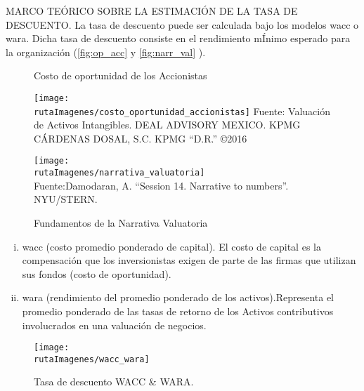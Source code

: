 \textcolor{secundario}{MARCO TE\'ORICO SOBRE LA ESTIMACI\'ON DE LA TASA DE DESCUENTO}. La tasa de descuento puede ser calculada bajo los modelos \gls{wacc} o \gls{wara}. Dicha tasa de descuento consiste en el rendimiento m\'Inimo esperado para la organizaci\'on (\autoref{fig:op_acc} y \autoref{fig:narr_val} ).

\begin{figure}[H]
\begin{minipage}{8cm}
\caption{Costo de oportunidad de los Accionistas\label{fig:op_acc}}
\texttt{[image: \\rutaImagenes/costo\_oportunidad\_accionistas]}
\footnotesize{Fuente: Valuaci\'on de Activos Intangibles. DEAL ADVISORY MEXICO. KPMG C\'ARDENAS DOSAL, S.C. KPMG ``D.R.'' \copyright 2016}
\end{minipage}
\quad
\begin{minipage}{8cm}
\caption{Fundamentos de la Narrativa Valuatoria\label{fig:narr_val}}
\texttt{[image: \\rutaImagenes/narrativa\_valuatoria]}\\
\footnotesize{Fuente:Damodaran, A. ``Session 14. Narrative to numbers''. NYU/STERN.}

\end{minipage}

\end{figure}

\begin{enumerate}[i)]
\item \textcolor{secundario}{\gls{wacc} (costo promedio ponderado de capital).} El costo de capital es la compensaci\'on que los inversionistas exigen de parte de las firmas que utilizan sus fondos (costo de oportunidad).
\item \textcolor{secundario}{\gls{wara} (rendimiento del promedio ponderado de los activos).}Representa el promedio ponderado de las tasas de retorno de los Activos contributivos involucrados en una valuaci\'on de negocios.
\end{enumerate}

\begin{figure}[H]
\centering
\caption{Tasa de descuento WACC \& WARA.\label{fig:wacc_wara}}
\texttt{[image: \\rutaImagenes/wacc\_wara]}
\end{figure}